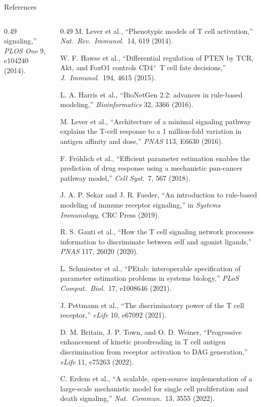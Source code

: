 \documentclass[aspectratio=169,10pt,t]{beamer}
\begin{document}
\begin{frame}{References}
\begin{columns}[T]
\begin{column}{0.49\textwidth}
        signaling,'' \emph{PLOS One} 9, e104240 (2014).\par
    \end{column}
    \begin{column}{0.49\textwidth}
      M. Lever et al., ``Phenotypic models of T cell activation,'' \emph{Nat.\ Rev.\ Immunol.}\
        14, 619 (2014).\par
      W. F. Hawse et al., ``Differential regulation of PTEN by TCR, Akt, and FoxO1 controls
        CD4$^+$ T cell fate decisions,'' \emph{J.\ Immunol.}\ 194, 4615 (2015).\par
      L. A. Harris et al., ``BioNetGen 2.2: advances in rule-based modeling,''
        \emph{Bioinformatics} 32, 3366 (2016).\par
      M. Lever et al., ``Architecture of a minimal signaling pathway explains the T-cell
        response to a 1 million-fold variation in antigen affinity and dose,''
        \emph{PNAS} 113, E6630 (2016).\par
      F. Fr\"ohlich et al., ``Efficient parameter estimation enables the prediction of drug
        response using a mechanistic pan-cancer pathway model,'' \emph{Cell Syst.}\ 7, 567 (2018).\par
      J. A. P. Sekar and J. R. Faeder, ``An introduction to rule-based modeling of immune
        receptor signaling,'' in \emph{Systems Immunology}, CRC Press (2019).\par
      R. S. Ganti et al., ``How the T cell signaling network processes information to
        discriminate between self and agonist ligands,'' \emph{PNAS} 117, 26020 (2020).\par
      L. Schmiester et al., ``PEtab: interoperable specification of parameter estimation
        problems in systems biology,'' \emph{PLoS Comput.\ Biol.}\ 17, e1008646 (2021).\par
      J. Pettmann et al., ``The discriminatory power of the T cell receptor,''
        \emph{eLife} 10, e67092 (2021).\par
      D. M. Britain, J. P. Town, and O. D. Weiner, ``Progressive enhancement of kinetic
        proofreading in T cell antigen discrimination from receptor activation to DAG
        generation,'' \emph{eLife} 11, e75263 (2022).\par
      C. Erdem et al., ``A scalable, open-source implementation of a large-scale mechanistic
        model for single cell proliferation and death signaling,''
        \emph{Nat.\ Commun.}\ 13, 3555 (2022).\par
    \end{column}
  \end{columns}
\end{frame}
\end{document}
